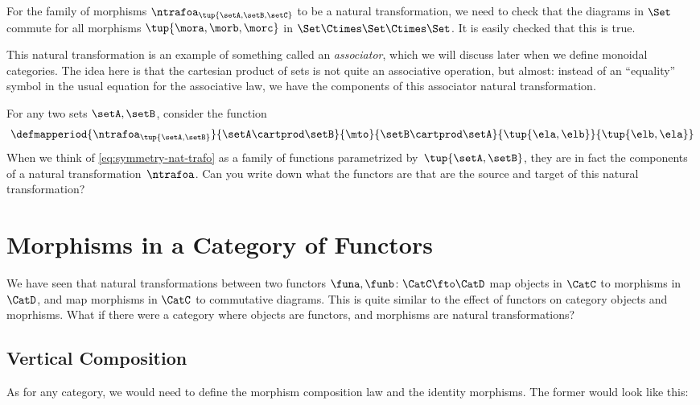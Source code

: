 \begin{example}
    For the family of morphisms $\ntrafoa_{\tup{\setA, \setB, \setC}}$ to be a natural transformation, we need to check that the diagrams
    in $\Set$ commute for all morphisms $\tup{\mora, \morb, \morc}$ in $\Set \Ctimes \Set \Ctimes \Set$.
    It is easily checked that this is true.

    This natural transformation is an example of something called an \emph{associator}, which we will discuss later when we define monoidal categories.
    The idea here is that the cartesian product of sets is not quite an associative operation, but almost: instead of an ``equality'' symbol in the usual equation for the associative law, we have the components of this associator natural transformation.
\end{example}

\begin{example}
    For any two sets $\setA, \setB$, consider the function
    \begin{equation}\label{eq:symmetry-nat-trafo}
        \defmapperiod{\ntrafoa_{\tup{\setA, \setB}}}{\setA \cartprod \setB}{\mto }{\setB \cartprod \setA}{\tup{\ela, \elb}}{\tup{\elb, \ela}}
    \end{equation}
    When we think of \cref{eq:symmetry-nat-trafo} as a family of functions parametrized by~$\tup{\setA, \setB}$, they are in fact the components of a natural transformation~$\ntrafoa$.
    Can you write down what the functors are that are the source and target of this natural transformation?
\end{example}

\section{Morphisms in a Category of Functors}
We have seen that natural transformations between two functors $\funa, \funb \colon \CatC \fto \CatD$ map objects in $\CatC$ to
morphisms in $\CatD$, and map morphisms in $\CatC$ to commutative diagrams.
This is quite similar to the effect of functors on category
objects and moprhisms.
What if there were a category where objects are functors, and morphisms are natural transformations?

\subsection{Vertical Composition}
As for any category, we would need to define the morphism composition law and the identity morphisms.
The former would look like this:

